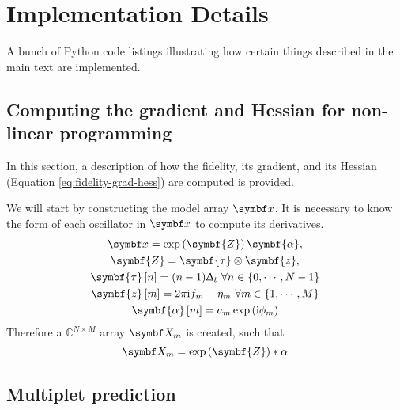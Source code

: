 \section{Implementation Details}

A bunch of Python code listings illustrating how certain things described in
the main text are implemented.

\subsection{Computing the gradient and Hessian for non-linear programming}

In this section, a description of how the fidelity, its gradient, and its
Hessian (Equation \ref{eq:fidelity-grad-hess}) are computed is provided.


We will start by constructing the model array $\bx$. It is necessary to know
the form of each oscillator in $\bx$ to compute its derivatives.
\begin{subequations}
    \begin{gather}
        \bx = \exp\left(\symbf{Z}\right) \symbf{\alpha},\\
        \symbf{Z} = \symbf{\tau} \otimes \symbf{z},\\
        \symbf{\tau}\left[n\right] = (n-1)\Dt\ \forall n \in \lbrace0, \cdots, N - 1\rbrace\\
        \symbf{z}\left[m\right] = 2 \pi \iu f_m- \eta_m\ \forall m \in \lbrace 1, \cdots, M \rbrace\\
        \symbf{\alpha}\left[m\right] = a_m \exp\left(\iu \phi_m\right)
    \end{gather}
\end{subequations}
Therefore a $\mathbb{C}^{N \times M}$ array $\bX_m$ is created, such that
\begin{equation}
    \bX_m = \exp\left(\symbf{Z}\right) * \alpha
\end{equation}




\subsection{Multiplet prediction}
\label{sec:multiplet prediction}

